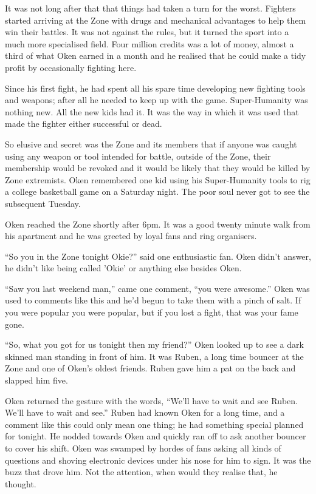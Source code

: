 It was not long after that that things had taken a turn for the worst.  Fighters started arriving at the Zone with drugs and mechanical advantages to help them win their battles.  It was not against the rules, but it turned the sport into a much more specialised field.  Four million credits was a lot of money, almost a third of what Oken earned in a month and he realised that he could make a tidy profit by occasionally fighting here.  

Since his first fight, he had spent all his spare time developing new fighting tools and weapons; after all he needed to keep up with the game.  Super-Humanity was nothing new.  All the new kids had it.  It was the way in which it was used that made the fighter either successful or dead.  

So elusive and secret was the Zone and its members that if anyone was caught using any weapon or tool intended for battle, outside of the Zone, their membership would be revoked and it would be likely that they would be killed by Zone extremists.  Oken remembered one kid using his Super-Humanity tools to rig a college basketball game on a Saturday night.  The poor soul never got to see the subsequent Tuesday.

Oken reached the Zone shortly after 6pm.  It was a good twenty minute walk from his apartment and he was greeted by loyal fans and ring organisers.

``So you in the Zone tonight Okie?'' said one enthusiastic fan.  Oken didn't answer, he didn't like being called 'Okie' or anything else besides Oken.

``Saw you last weekend man,'' came one comment, ``you were awesome.''  Oken was used to comments like this and he'd begun to take them with a pinch of salt.  If you were popular you were popular, but if you lost a fight, that was your fame gone.  

``So, what you got for us tonight then my friend?'' Oken looked up to see a dark skinned man standing in front of him.  It was Ruben, a long time bouncer at the Zone and one of Oken's oldest friends.  Ruben gave him a pat on the back and slapped him five.  

Oken returned the gesture with the words, ``We'll have to wait and see Ruben.  We'll have to wait and see.''  Ruben had known Oken for a long time, and a comment like this could only mean one thing; he had something special planned for tonight.  He nodded towards Oken and quickly ran off to ask another bouncer to cover his shift.  Oken was swamped by hordes of fans asking all kinds of questions and shoving electronic devices under his nose for him to sign.  It was the buzz that drove him.  Not the attention, when would they realise that, he thought.

